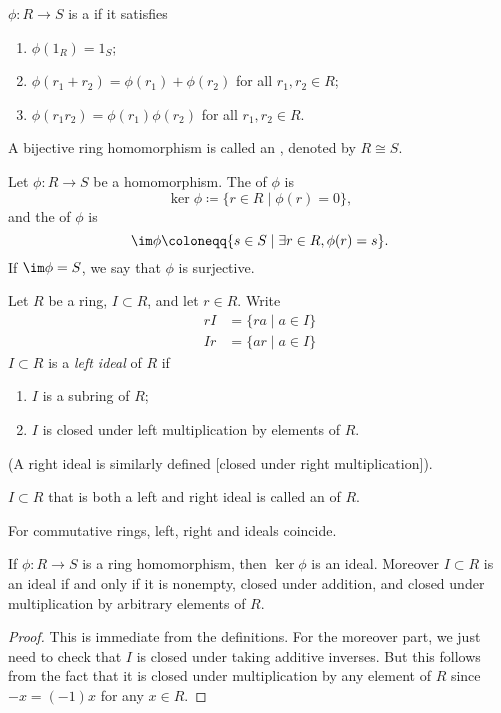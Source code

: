 \begin{definition}
$\phi:R\to S$ is a  if it satisfies
\begin{enumerate}[label=(\roman*)]
\item $\phi(1_R)=1_S$;
\item $\phi(r_1+r_2)=\phi(r_1)+\phi(r_2)$ for all $r_1,r_2\in R$;
\item $\phi(r_1r_2)=\phi(r_1)\phi(r_2)$ for all $r_1,r_2\in R$.
\end{enumerate}
A bijective ring homomorphism is called an , denoted by $R\cong S$.
\end{definition}

\begin{definition}
Let $\phi:R\to S$ be a homomorphism. The  of $\phi$ is
\[\ker\phi\coloneqq\{r\in R\mid\phi(r)=0\},\]
and the  of $\phi$ is
\[\im\phi\coloneqq\{s\in S\mid \exists r\in R, \phi(r)=s\}.\]
If $\im\phi=S$, we say that $\phi$ is surjective.
\end{definition}

\begin{definition}
Let $R$ be a ring, $I\subset R$, and let $r\in R$. Write
\begin{align*}
rI&=\{ra\mid a\in I\}\\
Ir&=\{ar\mid a\in I\}
\end{align*}
$I\subset R$ is a \emph{left ideal} of $R$ if
\begin{enumerate}[label=(\roman*)]
\item $I$ is a subring of $R$;
\item $I$ is closed under left multiplication by elements of $R$.
\end{enumerate}
(A right ideal is similarly defined [closed under right multiplication]).

$I\subset R$ that is both a left and right ideal is called an  of $R$.
\end{definition}

For commutative rings, left, right and ideals coincide.

\begin{lemma}
If $\phi:R\to S$ is a ring homomorphism, then $\ker\phi$ is an ideal. Moreover $I\subset R$ is an ideal if and only if it is nonempty, closed under addition, and closed under multiplication by arbitrary elements of $R$.
\end{lemma}

\begin{proof}
This is immediate from the definitions. For the moreover part, we just need to check that $I$ is closed under taking additive inverses. But this follows from the fact that it is closed under multiplication by any element of $R$ since $-x=(-1)x$ for any $x\in R$.
\end{proof}

